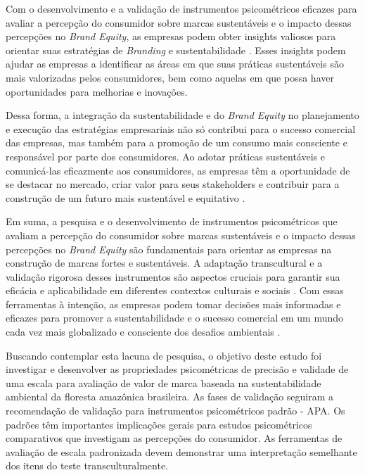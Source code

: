 Com o desenvolvimento e a validação de instrumentos psicométricos eficazes para avaliar a percepção do consumidor sobre marcas sustentáveis e o impacto dessas percepções no \textit{Brand Equity}, as empresas podem obter insights valiosos para orientar suas estratégias de \textit{Branding} e sustentabilidade \cite{Kolk2014SustainableDressing}. Esses insights podem ajudar as empresas a identificar as áreas em que suas práticas sustentáveis são mais valorizadas pelos consumidores, bem como aquelas em que possa haver oportunidades para melhorias e inovações.

Dessa forma, a integração da sustentabilidade e do \textit{Brand Equity} no planejamento e execução das estratégias empresariais não só contribui para o sucesso comercial das empresas, mas também para a promoção de um consumo mais consciente e responsável por parte dos consumidores. Ao adotar práticas sustentáveis e comunicá-las eficazmente aos consumidores, as empresas têm a oportunidade de se destacar no mercado, criar valor para seus stakeholders e contribuir para a construção de um futuro mais sustentável e equitativo \cite{Chernev2015DoingResponsibility}.

Em suma, a pesquisa e o desenvolvimento de instrumentos psicométricos que avaliam a percepção do consumidor sobre marcas sustentáveis e o impacto dessas percepções no \textit{Brand Equity} são fundamentais para orientar as empresas na construção de marcas fortes e sustentáveis. A adaptação transcultural e a validação rigorosa desses instrumentos são aspectos cruciais para garantir sua eficácia e aplicabilidade em diferentes contextos culturais e sociais \cite{Hur2014HowReputation}. Com essas ferramentas à intenção, as empresas podem tomar decisões mais informadas e eficazes para promover a sustentabilidade e o sucesso comercial em um mundo cada vez mais globalizado e consciente dos desafios ambientais \cite{Fatma2016MeasuringResponses}.

Buscando contemplar esta lacuna de pesquisa, o objetivo deste estudo foi investigar e desenvolver as propriedades psicométricas de precisão e validade de uma escala para avaliação de valor de marca baseada na sustentabilidade ambiental da floresta amazônica brasileira. As fases de validação seguiram a recomendação de validação para instrumentos psicométricos padrão - APA. Os padrões têm importantes implicações gerais para estudos psicométricos comparativos que investigam as percepções do consumidor. As ferramentas de avaliação de escala padronizada devem demonstrar uma interpretação semelhante dos itens do teste transculturalmente.

